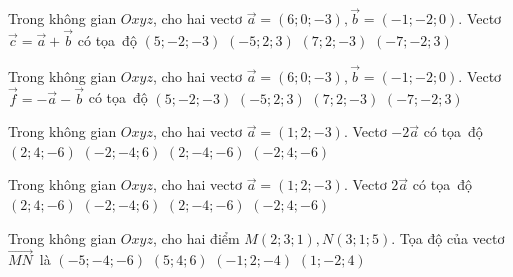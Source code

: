 \begin{ex}%
	Trong không  gian $Oxyz$, cho hai vectơ $\overrightarrow{a}=\left(6;0;-3 \right),\overrightarrow{b}=\left(-1;-2;0 \right)$. Vectơ $\overrightarrow{c}=\overrightarrow{a}+\overrightarrow{b}$ có tọa~độ
	 \choice
		 {\True $\left(5;-2;-3 \right)$}
		 {$\left(-5;2;3 \right)$}
		{$\left(7;2;-3 \right)$} 
		{$\left(-7;-2;3  \right)$}
\end{ex}

\begin{ex}%
	Trong không gian $Oxyz$, cho hai  vectơ $\overrightarrow{a}=\left(6;0;-3 \right),\overrightarrow{b}=\left(-1;-2;0 \right)$. Vectơ $\overrightarrow{f}=-\overrightarrow{a}-\overrightarrow{b}$ có tọa~độ
	\choice 
		 {$\left(5;-2;-3 \right)$}
		{\True  $\left(-5;2;3 \right)$}
		{$\left(7;2;-3 \right)$} 
		{$\left(-7;-2;3 \right)$} 
\end{ex}

\begin{ex}%
	Trong  không gian $Oxyz$, cho hai vectơ $\overrightarrow{a}=\left(1;2;-3 \right)$. Vectơ $-2\overrightarrow{a}$ có tọa~độ
	 \choice
		{$\left(2;4;-6  \right)$}
		{\True $\left(-2;-4;6  \right)$}
		 {$\left(2;-4;-6 \right)$}
		 {$\left(-2;4;-6 \right)$}
\end{ex}

\begin{ex}%
	Trong không gian  $Oxyz$, cho hai vectơ $\overrightarrow{a}=\left(1;2;-3 \right)$. Vectơ $2\overrightarrow{a}$ có tọa~độ
	\choice 
		{\True  $\left(2;4;-6 \right)$}
		{$\left(-2;-4;6  \right)$}
		 {$\left(2;-4;-6 \right)$}
		{$\left(-2;4;-6  \right)$}
\end{ex}

\begin{ex}%
	Trong không gian $Oxyz$, cho hai điểm $M\left(2;3;1  \right),N\left(3;1;5 \right)$. Tọa độ của vectơ $\overrightarrow{MN}$~là
	\choice 
		{$\left(-5;-4;-6 \right)$} 
		{$\left(5;4;6 \right)$} 
		{$\left(-1;2;-4 \right)$} 
		 {\True $\left(1;-2;4 \right)$}
\end{ex}


